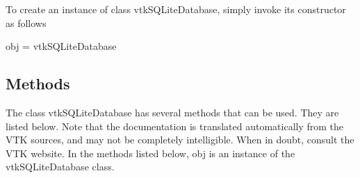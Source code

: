 To create an instance of class vtk\-S\-Q\-Lite\-Database, simply invoke its constructor as follows \begin{DoxyVerb}  obj = vtkSQLiteDatabase
\end{DoxyVerb}
 \hypertarget{vtkwidgets_vtkxyplotwidget_Methods}{}\subsection{Methods}\label{vtkwidgets_vtkxyplotwidget_Methods}
The class vtk\-S\-Q\-Lite\-Database has several methods that can be used. They are listed below. Note that the documentation is translated automatically from the V\-T\-K sources, and may not be completely intelligible. When in doubt, consult the V\-T\-K website. In the methods listed below, {\ttfamily obj} is an instance of the vtk\-S\-Q\-Lite\-Database class. 
